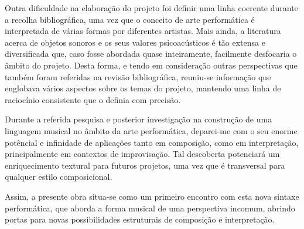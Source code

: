 \documentclass[../main.tex]{subfiles}
\begin{document}
Outra dificuldade na elaboração do projeto foi definir uma linha coerente durante a recolha bibliográfica, uma vez que o conceito de arte performática é interpretada de várias formas por diferentes artistas. Mais ainda, a literatura acerca de objetos sonoros e os seus valores psicoacústicos é tão extensa e diversificada que, caso fosse abordada quase inteiramente, facilmente desfocaria o âmbito do projeto. Desta forma, e tendo em consideração outras perspectivas que também foram referidas na revisão bibliográfica, reuniu-se informação que englobava vários aspectos sobre os temas do projeto, mantendo uma linha de raciocínio consistente que o definia com precisão.    

Durante a referida pesquisa e posterior investigação na construção de uma linguagem musical no âmbito da arte performática, deparei-me com o seu enorme potêncial e infinidade de aplicações tanto em composição, como em interpretação, principalmente em contextos de improvisação. Tal descoberta potenciará um enriquecimento textural para futuros projetos, uma vez que é transversal para qualquer estilo composicional.

Assim, a presente obra situa-se como um primeiro encontro com esta nova sintaxe performática, que aborda a forma musical de uma perspectiva incomum, abrindo portas para novas possibilidades estruturais de composição e interpretação.
\end{document}
